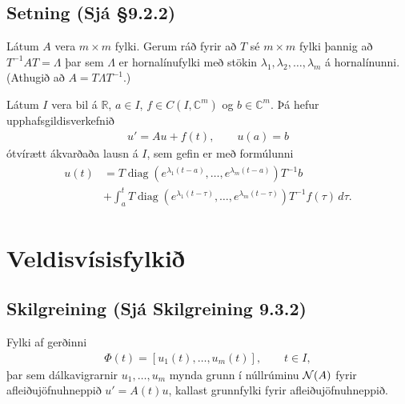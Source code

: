 \documentclass[a4paper,10pt,icelandic]{sphinxmanual}
\begin{document}
\subsection{Setning (Sjá \S{}9.2.2)}
\label{\detokenize{Kafli09:setning-sja-9-2-2}}
Látum \(A\) vera \(m\times m\) fylki. Gerum ráð fyrir að \(T\) sé \(m\times m\) fylki þannig að \(T^{-1}AT=\Lambda\) þar sem \(\Lambda\) er hornalínufylki með stökin \(\lambda_1, \lambda_2, \ldots, \lambda_m\) á hornalínunni. (Athugið að \(A=T\Lambda T^{-1}\).)

Látum \(I\) vera bil á \(\mathbb{R}\), \(a\in I\), \(f\in C(I,{\mathbb{C}}^m)\) og \(b\in {\mathbb{C}}^m\). Þá hefur upphafsgildisverkefnið
\begin{equation*}
\begin{split}u'=Au+f(t), \qquad u(a)=b\end{split}
\end{equation*}
ótvírætt ákvarðaða lausn á \(I\), sem gefin er með formúlunni
\begin{equation*}
\begin{split}\begin{aligned}
u(t)&=T{\operatorname{diag}}(e^{\lambda_1(t-a)},\dots,e^{\lambda_m(t-a)})T^{-1}b\\
&+\int_a^t T{\operatorname{diag}}(e^{\lambda_1(t-\tau)},\dots,e^{\lambda_m(t-\tau)})
T^{-1}f(\tau)\, d\tau.\end{aligned}\end{split}
\end{equation*}

\section{Veldisvísisfylkið}
\label{\detokenize{Kafli09:veldisvisisfylki}}

\subsection{Skilgreining (Sjá Skilgreining 9.3.2)}
\label{\detokenize{Kafli09:skilgreining-sja-skilgreining-9-3-2}}
Fylki af gerðinni
\begin{equation*}
\begin{split}\Phi(t)=[u_1(t),\dots,u_m(t)], \qquad t\in I,\end{split}
\end{equation*}
þar sem dálkavigrarnir \(u_1,\dots,u_m\) mynda grunn í núllrúminu \({\cal N}(A)\) fyrir afleiðujöfnuhneppið \(u'=A(t)u\), kallast grunnfylki fyrir afleiðujöfnuhneppið.
\end{document}
